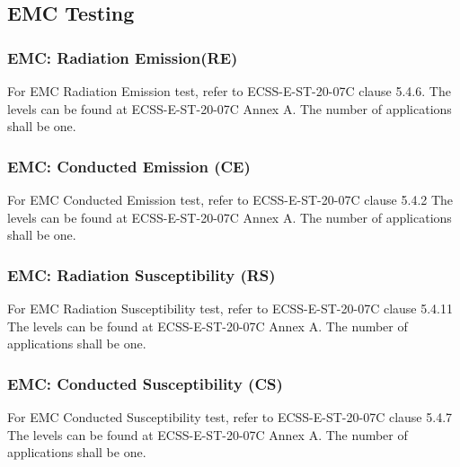 \subsection{EMC Testing}


\subsubsection{EMC: Radiation Emission(RE)}
For EMC Radiation Emission test, refer to ECSS-E-ST-20-07C clause 5.4.6. The levels
can be found at ECSS-E-ST-20-07C Annex A. The number of applications shall be one.

\subsubsection{EMC: Conducted Emission (CE)}
For EMC Conducted Emission test, refer to ECSS-E-ST-20-07C clause 5.4.2 The levels
can be found at ECSS-E-ST-20-07C Annex A. The number of applications shall be one.

\subsubsection{EMC: Radiation Susceptibility (RS)}
For EMC Radiation Susceptibility test, refer to ECSS-E-ST-20-07C clause 5.4.11 The
levels can be found at ECSS-E-ST-20-07C Annex A. The number of applications shall be one.

\subsubsection{EMC: Conducted Susceptibility (CS)}
For EMC Conducted Susceptibility test, refer to ECSS-E-ST-20-07C clause 5.4.7 The
levels can be found at ECSS-E-ST-20-07C Annex A. The number of applications shall be one.





